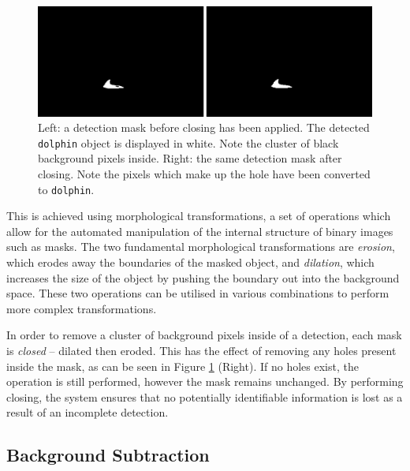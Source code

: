 \begin{figure}
	\begin{center}
		\includegraphics[scale=0.5]{Chapter3/figs/before-and-after-morphing-masks-only.png}
	\end{center}
	\caption[Left: a detection mask before closing has been applied. Right: the same detection mask after closing.]{Left: a detection mask before closing has been applied. The detected \texttt{dolphin} object is displayed in white. Note the cluster of black background pixels inside. Right: the same detection mask after closing. Note the pixels which make up the hole have been converted to \texttt{dolphin}.}
	\label{fig:before-and-after-morphing-masks-only}
\end{figure}

This is achieved using morphological transformations, a set of operations which allow for the automated manipulation of the internal structure of binary images such as masks. The two fundamental morphological transformations are \textit{erosion}, which erodes away the boundaries of the masked object, and \textit{dilation}, which increases the size of the object by pushing the boundary out into the background space. These two operations can be utilised in various combinations to perform more complex transformations.

In order to remove a cluster of background pixels inside of a detection, each mask is \textit{closed} -- dilated then eroded. This has the effect of removing any holes present inside the mask, as can be seen in Figure \ref{fig:before-and-after-morphing-masks-only} (Right). If no holes exist, the operation is still performed, however the mask remains unchanged. By performing closing, the system ensures that no potentially identifiable information is lost as a result of an incomplete detection. 

\subsection{Background Subtraction}\label{ch:cetDet,sec:postProcessing,sub:bgExtraction}

